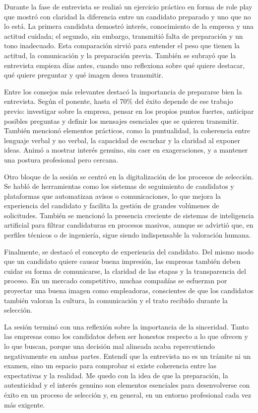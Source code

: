 Durante la fase de entrevista se realizó un ejercicio práctico en forma de role play que mostró con claridad la diferencia entre un candidato preparado y uno que no lo está. La primera candidata demostró interés, conocimiento de la empresa y una actitud cuidada; el segundo, sin embargo, transmitió falta de preparación y un tono inadecuado. Esta comparación sirvió para entender el peso que tienen la actitud, la comunicación y la preparación previa. También se subrayó que la entrevista empieza días antes, cuando uno reflexiona sobre qué quiere destacar, qué quiere preguntar y qué imagen desea transmitir.

Entre los consejos más relevantes destacó la importancia de prepararse bien la entrevista. Según el ponente, hasta el 70\% del éxito depende de ese trabajo previo: investigar sobre la empresa, pensar en los propios puntos fuertes, anticipar posibles preguntas y definir los mensajes esenciales que se quieren transmitir. También mencionó elementos prácticos, como la puntualidad, la coherencia entre lenguaje verbal y no verbal, la capacidad de escuchar y la claridad al exponer ideas. Animó a mostrar interés genuino, sin caer en exageraciones, y a mantener una postura profesional pero cercana.

Otro bloque de la sesión se centró en la digitalización de los procesos de selección. Se habló de herramientas como los sistemas de seguimiento de candidatos y plataformas que automatizan avisos o comunicaciones, lo que mejora la experiencia del candidato y facilita la gestión de grandes volúmenes de solicitudes. También se mencionó la presencia creciente de sistemas de inteligencia artificial para filtrar candidaturas en procesos masivos, aunque se advirtió que, en perfiles técnicos o de ingeniería, sigue siendo indispensable la valoración humana.

Finalmente, se destacó el concepto de experiencia del candidato. Del mismo modo que un candidato quiere causar buena impresión, las empresas también deben cuidar su forma de comunicarse, la claridad de las etapas y la transparencia del proceso. En un mercado competitivo, muchas compañías se esfuerzan por proyectar una buena imagen como empleadoras, conscientes de que los candidatos también valoran la cultura, la comunicación y el trato recibido durante la selección.

La sesión terminó con una reflexión sobre la importancia de la sinceridad. Tanto las empresas como los candidatos deben ser honestos respecto a lo que ofrecen y lo que buscan, porque una decisión mal alineada acaba repercutiendo negativamente en ambas partes. Entendí que la entrevista no es un trámite ni un examen, sino un espacio para comprobar si existe coherencia entre las expectativas y la realidad. Me quedo con la idea de que la preparación, la autenticidad y el interés genuino son elementos esenciales para desenvolverse con éxito en un proceso de selección y, en general, en un entorno profesional cada vez más exigente.
